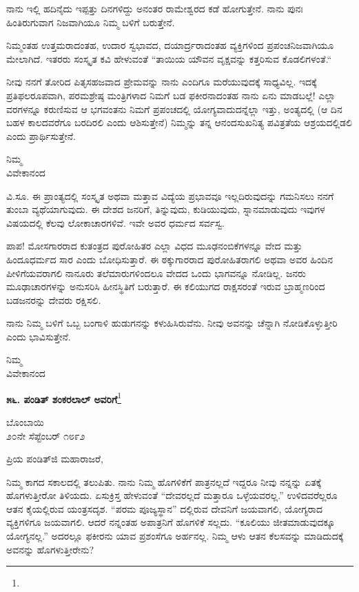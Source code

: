 ನಾನು ಇಲ್ಲಿ ಹದಿನೈದು ಇಪ್ಪತ್ತು ದಿನಗಳಿದ್ದು ಅನಂತರ ರಾಮೇಶ್ವರದ ಕಡೆ ಹೋಗು\-ತ್ತೇನೆ. ನಾನು ಪುನಃ ಹಿಂತಿರುಗುವಾಗ ನಿಜವಾಗಿಯೂ ನಿಮ್ಮ ಬಳಿಗೆ ಬರುತ್ತೇನೆ.

ನಿಮ್ಮಂತಹ ಉತ್ತಮರಾದಂತಹ, ಉದಾರ ಸ್ವಭಾವದ, ದಯಾರ್ದ್ರರಾದಂತಹ ವ್ಯಕ್ತಿಗಳಿಂದ ಪ್ರಪಂಚನಿಜವಾಗಿಯೂ ಮೇಲಾಗಿದೆ. ಇತರರು ಸಂಸ್ಕೃತ ಕವಿ ಹೇಳುವಂತೆ “ತಾಯಿಯ ಯೌವನ ವೃಕ್ಷವನ್ನು ಕತ್ತರಿಸುವ ಕೊಡಲಿಗಳಂತೆ.“

ನೀವು ನನಗೆ ತೋರಿದ ಪಿತೃಸಹಜವಾದ ಪ್ರೇಮವನ್ನು ನಾನು ಎಂದಿಗೂ ಮರೆಯುವುದಕ್ಕೆ ಸಾಧ್ಯವಿಲ್ಲ. ಇದಕ್ಕೆ ಪ್ರತಿಫಲರೂಪವಾಗಿ, ಪರಮಶ್ರೇಷ್ಠ ಮಂತ್ರಿಗಳಾದ ನಿಮಗೆ ಬಡ ಫಕೀರನಾದಂತಹ ನಾನು ಏನು ಮಾಡಬಲ್ಲೆ! ಎಲ್ಲಾ ವರಗಳನ್ನೂ ಕರುಣಿಸುವ ಆ ಭಗವಂತನು ನಿಮಗೆ ಪ್ರಪಂಚದಲ್ಲಿ ಯೋಗ್ಯವಾದುದನ್ನೆಲ್ಲಾ ಇತ್ತು, ಅಂತ್ಯದಲ್ಲಿ (ಆ ದಿನ ಬಹಳ ಕಾಲದವರೆಗೂ ಬರದಿರಲಿ ಎಂದು ಆಶಿಸುತ್ತೇನೆ) ನಿಮ್ಮನ್ನು ತನ್ನ ಆನಂದಸುಖನಿತ್ಯ ಪವಿತ್ರತೆಯ ಆಶ್ರಯದಲ್ಲಿಡಲಿ ಎಂದು ಪ್ರಾರ್ಥಿಸುತ್ತೇನೆ.

{\flushright
ನಿಮ್ಮ\\ವಿವೇಕಾನಂದ\par}

\medskip

ವಿ.ಸೂ. \enginline{-}ಈ ಪ್ರಾಂತ್ಯದಲ್ಲಿ ಸಂಸ್ಕೃತ ಅಥವಾ ಮತ್ತಾವ ವಿದ್ಯೆಯ ಪ್ರಭಾವವೂ ಇಲ್ಲದಿರುವುದನ್ನು ಗಮನಿಸಲು ನನಗೆ ತುಂಬಾ ವ್ಯಥೆಯಾಗುವುದು. ಈ ದೇಶದ ಜನರಿಗೆ, ತಿನ್ನುವುದು, ಕುಡಿಯುವುದು, ಸ್ನಾನಮಾಡುವುದು ಇವುಗಳ ವಿಷಯದಲ್ಲಿ ಕೆಲವು ಲೋಕಾಚಾರಗಳಿವೆ. ಇವೇ ಅವರ ಧರ್ಮದ ಸರ್ವಸ್ವ.

ಪಾಪ! ಮೋಸಗಾರರಾದ ಕುತಂತ್ರದ ಪುರೋಹಿತರ ಎಲ್ಲಾ ವಿಧದ ಮೂಢನಂಬಿಕೆಗಳನ್ನೂ ವೇದ ಮತ್ತು ಹಿಂದೂಧರ್ಮದ ಸಾರ ಎಂದು ಬೋಧಿಸುತ್ತಾರೆ. ಈ ಠಕ್ಕುಗಾರರಾದ ಪುರೋಹಿತರಾಗಲಿ ಅಥವಾ ಅವರ ಹಿಂದಿನ ಪೀಳಿಗೆಯವರಾಗಲಿ ನಾನೂರು ತಲೆಮಾರುಗಳಿಂದಲೂ ವೇದದ ಒಂದು ಭಾಗವನ್ನೂ ನೋಡಿಲ್ಲ. ಜನರು ಮೂಢಾಚಾರಗಳನ್ನು ಅನುಸರಿಸಿ ಹೀನಸ್ಥಿತಿಗೆ ಬರುತ್ತಾರೆ. ಈ ಕಲಿಯುಗದ ರಾಕ್ಷಸರಂತೆ ಇರುವ ಬ್ರಾಹ್ಮಣರಿಂದ ಬಡಜನರನ್ನು ದೇವರು ರಕ್ಷಿಸಲಿ.

ನಾನು ನಿಮ್ಮ ಬಳಿಗೆ ಒಬ್ಬ ಬಂಗಾಳಿ ಹುಡುಗನನ್ನು ಕಳುಹಿಸಿರುವೆನು. ನೀವು ಅವನನ್ನು ಚೆನ್ನಾಗಿ ನೋಡಿಕೊಳ್ಳುತ್ತೀರಿ ಎಂದು ಭಾವಿಸುತ್ತೇನೆ.


{\flushright
ನಿಮ್ಮ\\ವಿವೇಕಾನಂದ\par}

\begin{center}
\textbf{೫೬. ಪಂಡಿತ್‌ ಶಂಕರಲಾಲ್ ಅವರಿಗೆ}\footnote{}
\end{center}


\begin{flushright}
ಬೊಂಬಾಯಿ\\೨೦ನೇ ಸೆಪ್ಟೆಂಬರ್ ೧೮೯೨
\end{flushright}

\noindent
ಪ್ರಿಯ ಪಂಡಿತ್‌ಜಿ ಮಹಾರಾಜರೆ,

ನಿಮ್ಮ ಕಾಗದ ಸಕಾಲದಲ್ಲಿ ತಲುಪಿತು. ನಾನು ನಿಮ್ಮ ಹೊಗಳಿಕೆಗೆ ಪಾತ್ರನಲ್ಲದೆ ಇದ್ದರೂ ನೀವು ನನ್ನನ್ನು ಏತಕ್ಕೆ ಹೊಗಳುತ್ತೀರೋ ತಿಳಿಯದು. ಏಸುಕ್ರಿಸ್ತ ಹೇಳುವಂತೆ “ದೇವರಲ್ಲದೆ ಮತ್ತಾರೂ ಒಳ್ಳೆಯವರಲ್ಲ.” ಉಳಿದವರೆಲ್ಲರೂ ಆತನ ಕೈಯಲ್ಲಿರುವ ಯಂತ್ರಸದೃಶ.  “ಪರಮ ಪೂಜ್ಯಸ್ಥಾನ” ದಲ್ಲಿರುವ ದೇವನಿಗೆ ಜಯವಾಗಲಿ, ಯೋಗ್ಯರಾದ ವ್ಯಕ್ತಿಗಳಿಗೂ ಜಯವಾಗಲಿ. ಆದರೆ ನನ್ನಂತಹ ಅಪಾತ್ರನಿಗೆ ಹೊಗಳಿಕೆ ಸಲ್ಲದು. “ಕೂಲಿಯು ಜೀತಮಾಡುವುದಕ್ಕೂ ಯೋಗ್ಯನಲ್ಲ.” ಅದರಲ್ಲೂ ಫಕೀರನು ಯಾವ ಪ್ರಶಂಸೆಗೂ ಅರ್ಹನಲ್ಲ. ನಿಮ್ಮ ಆಳು ಆತನ ಕೆಲಸವನ್ನು ಮಾಡಿದುದಕ್ಕೆ ಅವನನ್ನು ಹೊಗಳುತ್ತೀರೇನು?


